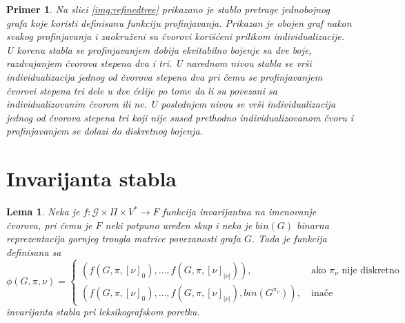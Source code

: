 \documentclass[12pt,oneside]{memoir}
\newtheorem{lemma}{Lema}
\newtheorem{example}{Primer}
\theoremstyle{definition}
\begin{document}
  \begin{example}
	  Na slici \ref{img:refinedtree} prikazano je stablo pretrage jednobojnog
	  grafa koje koristi definisanu funkciju profinjavanja. Prikazan je obojen
	  graf nakon svakog profinjavanja i zaokruženi su čvorovi korišćeni
	  prilikom individualizacije. U korenu stabla se profinjavanjem dobija
	  ekvitabilno bojenje sa dve boje, razdvajanjem čvorova stepena dva i tri.
	  U narednom nivou stabla se vrši individualizacija jednog od čvorova
	  stepena dva pri čemu se profinjavanjem čvorovi stepena tri dele u dve
	  ćelije po tome da li su povezani sa individualizovanim čvorom ili ne. U
	  poslednjem nivou se vrši individualizacija jednog od čvorova stepena tri
	  koji nije sused prethodno individualizovanom čvoru i profinjavanjem se
	  dolazi do diskretnog bojenja.
  \end{example}


 \section{Invarijanta stabla}

  \begin{lemma}
	  Neka je $f : \mathcal{G} \times \Pi \times V^* \to F$ funkcija
	  invarijantna na imenovanje čvorova, pri čemu je $F$ neki potpuno uređen
	  skup i neka je $bin(G)$ binarna reprezentacija gornjeg trougla matrice
	  povezanosti grafa $G$. Tada je funkcija definisana sa
	  $$ \phi(G, \pi, \nu) =
	  \begin{cases}
		  (f(G, \pi, [\nu]_0), \dots, f(G, \pi, [\nu]_{|\nu|})), & \ \text{ako } \pi_\nu \text{ nije diskretno} \\
		  (f(G, \pi, [\nu]_0), \dots, f(G, \pi, [\nu]_{|\nu|}), bin(G^{\pi_\nu})), & \ \text{inače}
	  \end{cases}
	  $$ invarijanta stabla pri leksikografskom poretku.
  \end{lemma}
\end{document}
